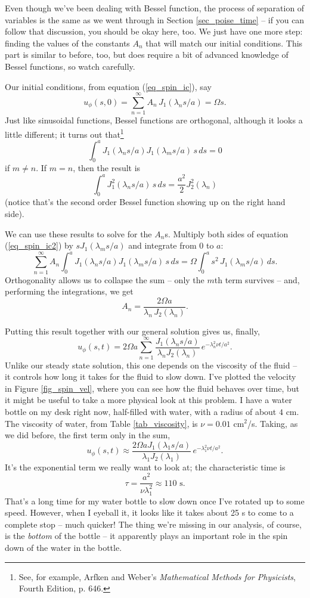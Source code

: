 Even though we've been dealing with Bessel function, the process of separation of variables is the same as we went through in Section \ref{sec_poise_time} -- if you can follow that discussion, you should be okay here, too.  We just have one more step:  finding the values of the constants $A_n$ that will match our initial conditions.  This part is similar to before, too, but does require a bit of advanced knowledge of Bessel functions, so watch carefully.

Our initial conditions, from equation (\ref{eq_spin_ic}), say
\begin{equation}
\label{eq_spin_ic2}
u_\phi(s,0) =  \sum_{n=1}^\infty A_n \, J_1(\lambda_n s / a) = \Omega s.
\end{equation}
Just like sinusoidal functions, Bessel functions are orthogonal, although it looks a little different; it turns out that\footnote{See, for example, Arfken and Weber's \emph{Mathematical Methods for Physicists}, Fourth Edition, p. 646.}
\[
\int_0^a J_1(\lambda_n s / a) J_1(\lambda_m s /a) \, s\, ds = 0
\]
if $m \neq n$.  If $m = n$, then the result is
\[
\int_0^a J_1^2(\lambda_n s / a) \, s \, ds = \frac{a^2}{2} J_2^2(\lambda_n)
\]
(notice that's the second order Bessel function showing up on the right hand side).

We can use these results to solve for the $A_n$s.  Multiply both sides of equation (\ref{eq_spin_ic2}) by $s J_1(\lambda_m s /a)$ and integrate from $0$ to $a$:
\[
\sum_{n=1}^\infty A_n \int_0^a J_1(\lambda_n s / a) J_1(\lambda_m s /a) \, s\, ds = \Omega \int_0^a s^2 \, J_1(\lambda_m s/a) \, ds.
\]
Orthogonality allows us to collapse the sum -- only the $m$th term survives -- and, performing the integrations, we get
\[
A_n = \frac{2 \Omega a}{\lambda_n \, J_2(\lambda_n)}.
\]

Putting this result together with our general solution gives us, finally,
\begin{equation}
u_\phi(s, t) = 2\Omega a \sum_{n=1}^\infty \frac{J_1(\lambda_n s/a)}{\lambda_n J_2(\lambda_n)} \, e^{-\lambda_n^2 \nu t / a^2}.
\end{equation}
Unlike our steady state solution, this one depends on the viscosity of the fluid -- it controls how long it takes for the fluid to slow down.  I've plotted the velocity in Figure \ref{fig_spin_vel}, where you can see how the fluid behaves over time, but it might be useful to take a more physical look at this problem.  I have a water bottle on my desk right now, half-filled with water, with a radius of about $4$ cm.  The viscosity of water, from Table \ref{tab_viscosity}, is $\nu = 0.01$ cm$^2$/s.  Taking, as we did before, the first term only in the sum, 
\[
u_\phi(s, t) \approx \frac{2\Omega a J_1(\lambda_1 s/a)}{\lambda_1 J_2(\lambda_1)} \, e^{-\lambda_1^2 \nu t / a^2}.
\]
It's the exponential term we really want to look at; the characteristic time is
\[
\tau = \frac{a^2}{\nu \lambda_1^2} \approx 110 \text{ s}.
\]
That's a long time for my water bottle to slow down once I've rotated up to some speed.  However, when I eyeball it, it looks like it takes about 25 s to come to a complete stop -- much quicker!  The thing we're missing in our analysis, of course, is the \emph{bottom} of the bottle -- it apparently plays an important role in the spin down of the water in the bottle.

